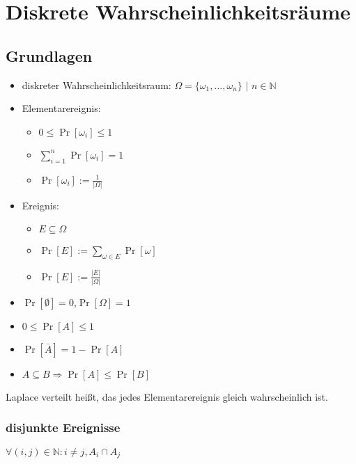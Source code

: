 \documentclass[a4,12pt]{scrartcl}
\begin{document}
\section{Diskrete Wahrscheinlichkeitsräume}

\subsection{Grundlagen}

\begin{itemize}
\item diskreter Wahrscheinlichkeitsraum: $\Omega = \{\omega_1,\ldots,\omega_n\}$ $|$ $n\in \mathbb{N}$
\item Elementarereignis:\\
	\begin{itemize}
	\item $0 \leq \Pr[\omega_i]\leq 1$
	\item $\sum_{i=1}^n\Pr[\omega_i]=1$
	\item $\Pr[\omega_i]:=\frac{1}{|\Omega|}$
	\end{itemize}
\item Ereignis:\\
	\begin{itemize}
	\item $E\subseteq\Omega$
	\item $\Pr[E]:=\sum_{\omega\in E}\Pr[\omega]$
	\item $\Pr[E]:=\frac{|E|}{|\Omega|}$
	\end{itemize}
\item $\Pr[\emptyset]=0$,$\Pr[\Omega]=1$ 
\item $0\leq \Pr[A] \leq 1$
\item $\Pr[\bar A]=1-\Pr[A]$
\item $A\subseteq B \Rightarrow \Pr[A]\leq \Pr[B]$
\end{itemize}

Laplace verteilt heißt, das jedes Elementarereignis gleich wahrscheinlich ist.

\subsubsection{disjunkte Ereignisse}
$\forall(i,j)\in\mathbb{N}: i\neq j, A_i\cap  A_j$
\end{document}
